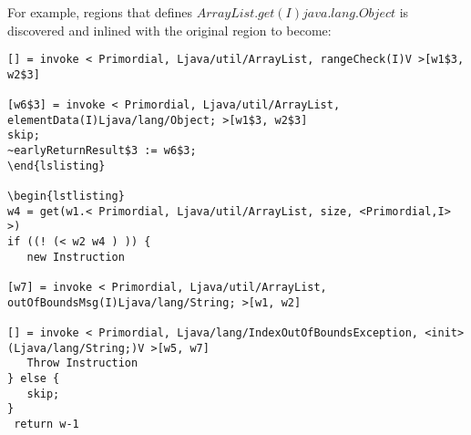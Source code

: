 For example, regions that defines $ArrayList.get(I)java.lang.Object$ is discovered and inlined with the original region to become:
\begin{lstlisting}
[] = invoke < Primordial, Ljava/util/ArrayList, rangeCheck(I)V >[w1$3, w2$3]

[w6$3] = invoke < Primordial, Ljava/util/ArrayList, elementData(I)Ljava/lang/Object; >[w1$3, w2$3]
skip; 
~earlyReturnResult$3 := w6$3; 
\end{lslisting}

\begin{lstlisting}
w4 = get(w1.< Primordial, Ljava/util/ArrayList, size, <Primordial,I> >)
if ((! (< w2 w4 ) )) {
   new Instruction
   
[w7] = invoke < Primordial, Ljava/util/ArrayList, outOfBoundsMsg(I)Ljava/lang/String; >[w1, w2]
   
[] = invoke < Primordial, Ljava/lang/IndexOutOfBoundsException, <init>(Ljava/lang/String;)V >[w5, w7]
   Throw Instruction
} else {
   skip; 
}
 return w-1
 \end{lstlisting}
 
